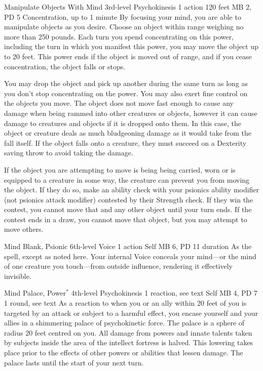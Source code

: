   \DndPowerHeader%
    {Manipulate Objects With Mind}
    {3rd-level Psychokinesis}
    {1 action}
    {120 feet}
    {MB 2, PD 5}
    {Concentration, up to 1 minute}
  By focusing your mind, you are able to manipulate objects as you desire.
  Choose an object within range weighing no more than 250 pounds.
  Each turn you spend concentrating on this power,
  including the turn in which you manifest this power,
  you may move the object up to 20 feet.
  This power ends if the object is moved out of range,
  and if you cease concentration,
  the object falls or stops.

  You may drop the object and pick up another during
  the same turn as long as you don't stop concentrating
  on the power.
  You may also exert fine control on the objects you move.
  The object does not move fast enough to cause any damage
  when being rammed into other creatures or objects,
  however it can cause damage to creatures and objects
  if it is dropped onto them.
  In this case, the object or creature deals as much
  bludgeoning damage as it would take from the fall itself.
  If the object falls onto a creature,
  they must succeed on a Dexterity saving throw
  to avoid taking the damage.

  If the object you are attempting to move is being being carried, worn
  or is equipped to a creature in some way,
  the creature can prevent you from moving the object.
  If they do so, make an ability check with your
  psionics ability modifier (not psionics attack modifier)
  contested by their Strength check.
  If they win the contest, you cannot move that and
  any other object until your turn ends.
  If the contest ends in a draw, you cannot move
  that object, but you may attempt to move others.
  
\DndPowerHeader%
  {Mind Blank, Psionic}
  {6th-level Voice}
  {1 action}
  {Self}
  {MB 6, PD 11}
  {duration}
As the  spell, except as noted here.
Your internal Voice conceals your mind---or
the mind of one creature you touch---from
outside influence,
rendering it effectively invisible. 

\DndPowerHeader%
  {Mind Palace, Power$^*$}
  {4th-level Psychokinesis}
  {1 reaction, see text}
  {Self}
  {MB 4, PD 7}
  {1 round, see text}
  As a reaction to when you or an ally within 20 feet of you
  is targeted by an attack or subject to a harmful effect,
  you encase yourself and your allies in a
  shimmering palace of psychokinetic force.
  The palace is a sphere of radius 20 feet centred on you. 
  All damage from powers and innate talents
  taken by subjects inside the area of the intellect fortress
  is halved.
  This lowering takes place prior to the effects
  of other powers or abilities that lessen damage.
  The palace lasts until the start of your next turn.
  
